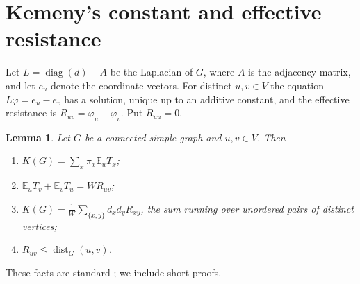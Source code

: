 \documentclass[11pt]{amsart}
\numberwithin{equation}{section}
\newtheorem{lemma}[theorem]{Lemma}
\theoremstyle{remark}
\newcommand{\E}{\mathbb E}
\newcommand{\dist}{\operatorname{dist}}
\begin{document}
\section{Kemeny's constant and effective resistance}\label{sec:resistance}
Let $L=\operatorname{diag}(d)-A$ be the Laplacian of $G$, where $A$ is the adjacency matrix, and let $e_u$ denote the coordinate vectors. For distinct $u,v\in V$ the equation $L\varphi=e_u-e_v$ has a solution, unique up to an additive constant, and the effective resistance is $R_{uv}=\varphi_u-\varphi_v$. Put $R_{uu}=0$.

\begin{lemma}\label{lem:formulas}
Let $G$ be a connected simple graph and $u,v\in V$. Then
\begin{enumerate}
\item[(a)] $K(G)=\sum_{x}\pi_x\E_uT_x$;
\item[(b)] $\E_uT_v+\E_vT_u=WR_{uv}$;
\item[(c)] $K(G)=\frac1W\sum_{\{x,y\}}d_xd_yR_{xy}$, the sum running over unordered pairs of distinct vertices;
\item[(d)] $R_{uv}\le\dist_G(u,v)$.
\end{enumerate}
\end{lemma}

These facts are standard \cite[Chapter~3]{AF}; we include short proofs.
\end{document}
